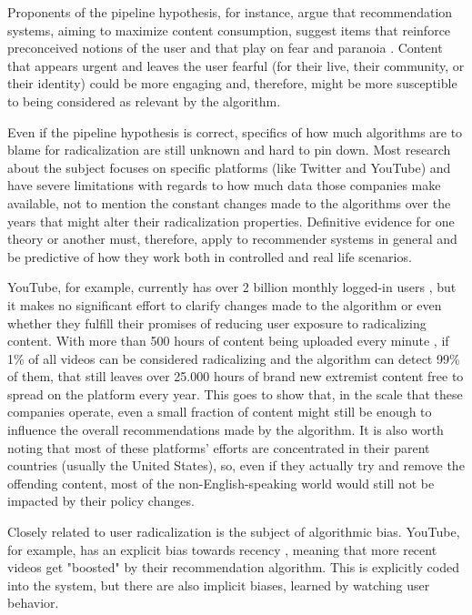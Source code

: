 Proponents of the pipeline hypothesis, for instance, argue that recommendation
systems, aiming to maximize content consumption, suggest items that reinforce
preconceived notions of the user and that play on fear and paranoia
\citep{ribeiro_auditing_2020}. Content that appears urgent and leaves the user
fearful (for their live, their community, or their identity) could be more
engaging and, therefore, might be more susceptible to being considered as
relevant by the algorithm.

Even if the pipeline hypothesis is correct, specifics of how much algorithms are
to blame for radicalization are still unknown and hard to pin down. Most
research about the subject focuses on specific platforms (like Twitter and
YouTube) and have severe limitations with regards to how much data those
companies make available, not to mention the constant changes made to the
algorithms over the years that might alter their radicalization properties.
Definitive evidence for one theory or another must, therefore, apply to
recommender systems in general and be predictive of how they work both in
controlled and real life scenarios.

YouTube, for example, currently has over 2 billion monthly logged-in users
\citep{noauthor_youtube_nodate}, but it makes no significant effort to clarify
changes made to the algorithm or even whether they fulfill their promises of
reducing user exposure to radicalizing content. With more than 500 hours of
content being uploaded every minute \citep{noauthor_youtube_nodate}, if 1\% of
all videos can be considered radicalizing and the algorithm can detect 99\% of
them, that still leaves over 25.000 hours of brand new extremist content free to
spread on the platform every year. This goes to show that, in the scale that
these companies operate, even a small fraction of content might still be enough
to influence the overall recommendations made by the algorithm. It is also worth
noting that most of these platforms' efforts are concentrated in their parent
countries (usually the United States), so, even if they actually try and remove
the offending content, most of the non-English-speaking world would still not be
impacted by their policy changes.

Closely related to user radicalization is the subject of algorithmic bias.
YouTube, for example, has an explicit bias towards recency
\citep{covington_deep_2016}, meaning that more recent videos get "boosted" by
their recommendation algorithm. This is explicitly coded into the system, but
there are also implicit biases, learned by watching user behavior.

